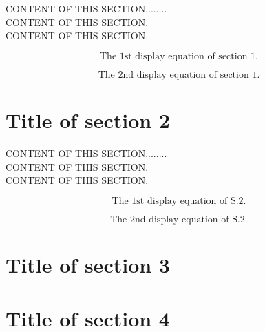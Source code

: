\documentclass[10pt]{book}
\theoremstyle{definition}
\begin{document}
CONTENT OF THIS SECTION........\\
CONTENT OF THIS SECTION.\\
CONTENT OF THIS SECTION.\\
\par
\begin{equation}
\mbox {The 1st display equation of section 1.}
\end{equation}

\begin{equation}
\mbox {The 2nd display equation of section 1.}
\end{equation}

\section{Title of section 2}
\setcounter{equation}{0}

CONTENT OF THIS SECTION........\\
CONTENT OF THIS SECTION.\\
CONTENT OF THIS SECTION.\\
\par

\begin{equation}
\mbox {The 1st display equation of S.2.}
\end{equation}

\begin{equation}
\mbox {The 2nd display equation of S.2.}
\end{equation}

\newpage
\lhead[\footnotesize\thepage\fancyplain{}\leftmark]{}\rhead[]{\fancyplain{}\rightmark\footnotesize\thepage}%


\section{Title of section 3}
\setcounter{equation}{0}


\section{Title of section 4}
\setcounter{equation}{0}
\end{document}
